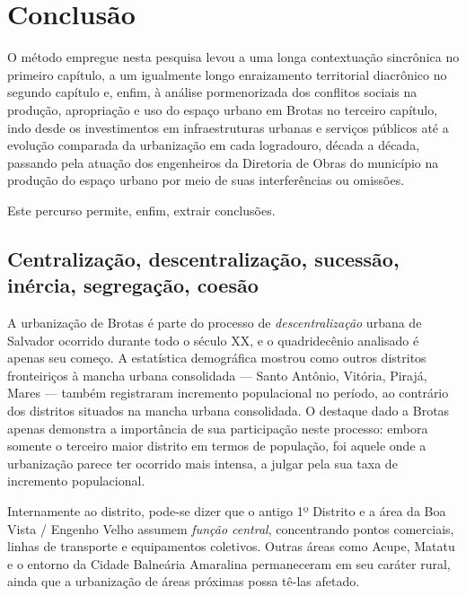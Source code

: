 \chapter*[Conclusão]{Conclusão}\label{concl}


O método empregue nesta pesquisa levou a uma longa contextuação sincrônica no primeiro capítulo, a um igualmente longo enraizamento territorial diacrônico no segundo capítulo e, enfim, à análise pormenorizada dos conflitos sociais na produção, apropriação e uso do espaço urbano em Brotas no terceiro capítulo, indo desde os investimentos em infraestruturas urbanas e serviços públicos até a evolução comparada da urbanização em cada logradouro, década a década, passando pela atuação dos engenheiros da Diretoria de Obras do município na produção do espaço urbano por meio de suas interferências ou omissões.

Este percurso permite, enfim, extrair conclusões. 

\section{Centralização, descentralização, sucessão, inércia, segregação, coesão}\label{subsec:3.3.1}

A urbanização de Brotas é parte do processo de \textit{descentralização} urbana de Salvador ocorrido durante todo o século XX, e o quadridecênio analisado é apenas seu começo. A estatística demográfica mostrou como outros distritos fronteiriços à mancha urbana consolidada --- Santo Antônio, Vitória, Pirajá, Mares --- também registraram incremento populacional no período, ao contrário dos distritos situados na mancha urbana consolidada. O destaque dado a Brotas apenas demonstra a importância de sua participação neste processo: embora somente o terceiro maior distrito em termos de população, foi aquele onde a urbanização parece ter ocorrido mais intensa, a julgar pela sua taxa de incremento populacional.

Internamente ao distrito, pode-se dizer que o antigo 1º Distrito e a área da Boa Vista / Engenho Velho assumem \textit{função central}, concentrando pontos comerciais, linhas de transporte e equipamentos coletivos. Outras áreas como Acupe, Matatu e o entorno da Cidade Balneária Amaralina permaneceram em seu caráter rural, ainda que a urbanização de áreas próximas possa tê-las afetado. 

